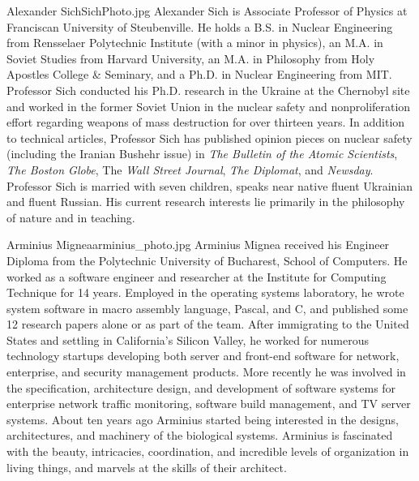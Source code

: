 
\begin{authorbio}{Alexander Sich}{SichPhoto.jpg}{}
Alexander Sich is Associate Professor of Physics at Franciscan University of Steubenville. He holds a B.S. in Nuclear Engineering from Rensselaer Polytechnic Institute (with a minor in physics), an M.A. in Soviet Studies from Harvard University, an M.A. in Philosophy from Holy Apostles College \& Seminary, and a Ph.D. in Nuclear Engineering from MIT.  Professor Sich conducted his Ph.D. research in the Ukraine at the Chernobyl site and worked in the former Soviet Union in the nuclear safety and nonproliferation effort regarding weapons of mass destruction for over thirteen years. In addition to technical articles, Professor Sich has published opinion pieces on nuclear safety (including the Iranian Bushehr issue) in \emph{The Bulletin of the Atomic Scientists}, \emph{The Boston Globe}, The \emph{Wall Street Journal}, \emph{The Diplomat}, and \emph{Newsday}. Professor Sich is married with seven children, speaks near native fluent Ukrainian and fluent Russian. His current research interests lie primarily in the philosophy of nature and in teaching.
\end{authorbio}

\begin{authorbio}{Arminius Mignea}{arminius_photo.jpg}{}
Arminius Mignea received his Engineer Diploma from the Polytechnic University of Bucharest, School of Computers. He worked as a software engineer and researcher at the Institute for Computing Technique for 14 years. Employed in the operating systems laboratory, he wrote system software in macro assembly language, Pascal, and C, and published some 12 research papers alone or as part of the team. After immigrating to the United States and settling in California's Silicon Valley, he worked for numerous technology startups developing both server and front-end software for network, enterprise, and security management products. More recently he was involved in the specification, architecture design, and development of software systems for enterprise network traffic monitoring, software build management, and TV server systems. About ten years ago Arminius started being interested in the designs, architectures, and machinery of the biological systems. Arminius is fascinated with the beauty, intricacies, coordination, and incredible levels of organization in living things, and marvels at the skills of their architect.
\end{authorbio}

